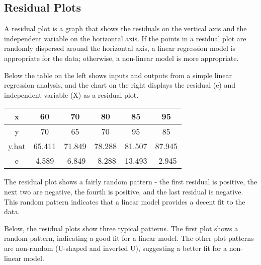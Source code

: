 \documentclass[Main.tex]{subfiles}
\begin{document}
\subsection{Residual Plots}
A residual plot is a graph that shows the residuals on the vertical axis and the independent variable on the horizontal axis. If the points in a residual plot are randomly dispersed around the horizontal axis, a linear regression model is appropriate for the data; otherwise, a non-linear model is more appropriate.

Below the table on the left shows inputs and outputs from a simple linear regression analysis, and the chart on the right displays the residual (e) and independent variable (X) as a residual plot.

\begin{center}
\begin{tabular}{|c|c|c|c|c|c|}
x &	60	& 70	& 80	& 85 &	95 \\ \hline
y &	70	& 65	& 70	& 95 &	85 \\ \hline
y.hat	& 65.411 &	71.849 &	78.288 &	81.507	& 87.945 \\ \hline
e	& 4.589	& -6.849 &	-8.288 &	13.493 &	-2.945 \\ \hline
\end{tabular}
\end{center}

The residual plot shows a fairly random pattern - the first residual is positive, the next two are negative, the fourth is positive, and the last residual is negative. This random pattern indicates that a linear model provides a decent fit to the data.

Below, the residual plots show three typical patterns. The first plot shows a random pattern, indicating a good fit for a linear model. The other plot patterns are non-random (U-shaped and inverted U), suggesting a better fit for a non-linear model.




\end{document}
